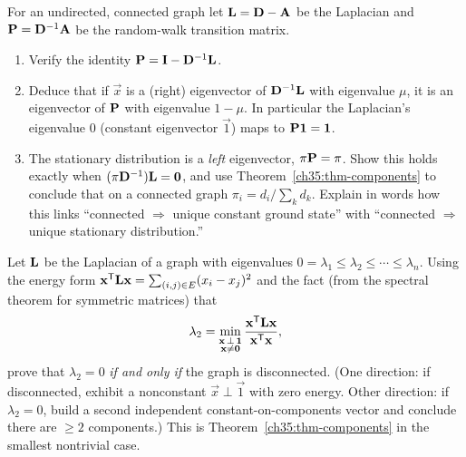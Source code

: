 \begin{exercise}
\label{ch35:ex-bridge}
For an undirected, connected graph let $\mathbf{L} = \mathbf{D}-\mathbf{A}$ be the Laplacian and
$\mathbf{P} = \mathbf{D}^{-1}\mathbf{A}$ be the random-walk transition matrix.
\begin{enumerate}
\item Verify the identity $\mathbf{P} = \mathbf{I} - \mathbf{D}^{-1}\mathbf{L}$.
\item Deduce that if $\vec{x}$ is a (right) eigenvector of $\mathbf{D}^{-1}\mathbf{L}$ with eigenvalue
$\mu$, it is an eigenvector of $\mathbf{P}$ with eigenvalue $1-\mu$. In particular the
Laplacian's eigenvalue $0$ (constant eigenvector $\vec{1}$) maps to $\mathbf{P}\mathbf{1}=\mathbf{1}$.
\item The stationary distribution is a \emph{left} eigenvector, $\mathbf{\pi}\mathbf{P}=\mathbf{\pi}$.
Show this holds exactly when $(\mathbf{\pi}\mathbf{D}^{-1})\mathbf{L}=\mathbf{0}$, and use
Theorem~\ref{ch35:thm-components} to conclude that on a connected graph
$\pi_i = d_i/\sum_k d_k$. Explain in words how this links ``connected $\Rightarrow$ unique
constant ground state'' with ``connected $\Rightarrow$ unique stationary distribution.''
\end{enumerate}
\end{exercise}

\begin{exercise}
\label{ch35:ex-fiedler}
Let $\mathbf{L}$ be the Laplacian of a graph with eigenvalues
$0 = \lambda_1 \le \lambda_2 \le \cdots \le \lambda_n$. Using the energy form
$\mathbf{x}^{\mathsf{T}}\mathbf{L}\mathbf{x} = \sum_{(i,j)\in E}(x_i-x_j)^2$ and the fact (from the spectral
theorem for symmetric matrices) that
\[
\lambda_2 = \min_{\substack{\mathbf{x}\,\perp\,\mathbf{1}\\ \mathbf{x}\ne\mathbf{0}}}
\frac{\mathbf{x}^{\mathsf{T}}\mathbf{L}\mathbf{x}}{\mathbf{x}^{\mathsf{T}}\mathbf{x}},
\]
prove that $\lambda_2 = 0$ \emph{if and only if} the graph is disconnected. (One direction:
if disconnected, exhibit a nonconstant $\vec{x}\perp\vec1$ with zero energy. Other direction:
if $\lambda_2 = 0$, build a second independent constant-on-components vector and conclude
there are $\ge 2$ components.) This is Theorem~\ref{ch35:thm-components} in the
smallest nontrivial case.
\end{exercise}
